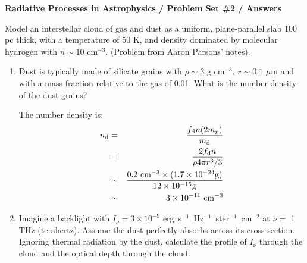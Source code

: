 \documentclass[11pt, preprint]{article}
\begin{document}
\begin{center}
  {\bf Radiative Processes in Astrophysics / Problem Set \#2 /
    Answers}
\end{center}

\noindent Model an interstellar cloud of gas and dust as a uniform,
  plane-parallel slab 100 pc thick, with a temperature of 50 K, and
  density dominated by molecular hydrogen with $n \sim 10$
  cm$^{-3}$. (Problem from Aaron Parsons' notes).
\begin{enumerate}
\item Dust is typically made of silicate grains with $\rho \sim 3$ g
  cm$^{-3}$, $r\sim 0.1$ $\mu$m and with a mass fraction relative to
  the gas of 0.01. What is the number density of the dust grains?

  \begin{answer}
    The number density is:
    \begin{eqnarray}
      n_{\rm d} &=& \frac{f_{\rm d} n (2 m_p)}{m_{\rm d}} \cr
      &=& \frac{2 f_{\rm d} n}{\rho 4\pi r^3 /3} \cr
      &\sim& \frac{0.2 {\rm ~cm}^{-3}
        \times (1.7 \times 10^{-24} {\rm g})}{12 \times 10^{-15} {\rm g}}\cr
      &\sim& 3 \times 10^{-11} {\rm ~cm}^{-3}
    \end{eqnarray}
  \end{answer}
    
\item Imagine a backlight with $I_\nu = 3\times 10^{-9}$
  erg~s$^{-1}$~Hz$^{-1}$~ster$^{-1}$~cm$^{-2}$ at $\nu =$ 1 THz
  (terahertz). Assume the dust perfectly absorbs across its
  cross-section. Ignoring thermal radiation by the dust, calculate
  the profile of $I_\nu$ through the cloud and the optical depth
  through the cloud.


\end{enumerate}
\end{document}
